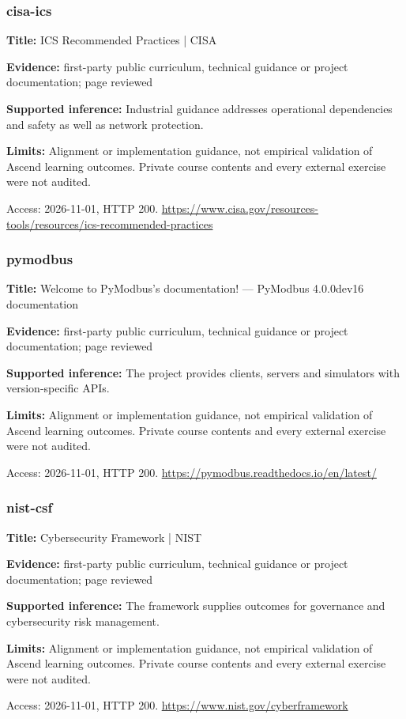 \subsubsection{cisa-ics}
\noindent\textbf{Title:} ICS Recommended Practices | CISA\par
\noindent\textbf{Evidence:} first-party public curriculum, technical guidance or project documentation; page reviewed\par
\noindent\textbf{Supported inference:} Industrial guidance addresses operational dependencies and safety as well as network protection.\par
\noindent\textbf{Limits:} Alignment or implementation guidance, not empirical validation of Ascend learning outcomes. Private course contents and every external exercise were not audited.\par
\noindent Access: 2026-11-01, HTTP 200. \url{https://www.cisa.gov/resources-tools/resources/ics-recommended-practices}
\subsubsection{pymodbus}
\noindent\textbf{Title:} Welcome to PyModbus’s documentation! — PyModbus 4.0.0dev16 documentation\par
\noindent\textbf{Evidence:} first-party public curriculum, technical guidance or project documentation; page reviewed\par
\noindent\textbf{Supported inference:} The project provides clients, servers and simulators with version-specific APIs.\par
\noindent\textbf{Limits:} Alignment or implementation guidance, not empirical validation of Ascend learning outcomes. Private course contents and every external exercise were not audited.\par
\noindent Access: 2026-11-01, HTTP 200. \url{https://pymodbus.readthedocs.io/en/latest/}
\subsubsection{nist-csf}
\noindent\textbf{Title:} Cybersecurity Framework | NIST\par
\noindent\textbf{Evidence:} first-party public curriculum, technical guidance or project documentation; page reviewed\par
\noindent\textbf{Supported inference:} The framework supplies outcomes for governance and cybersecurity risk management.\par
\noindent\textbf{Limits:} Alignment or implementation guidance, not empirical validation of Ascend learning outcomes. Private course contents and every external exercise were not audited.\par
\noindent Access: 2026-11-01, HTTP 200. \url{https://www.nist.gov/cyberframework}
